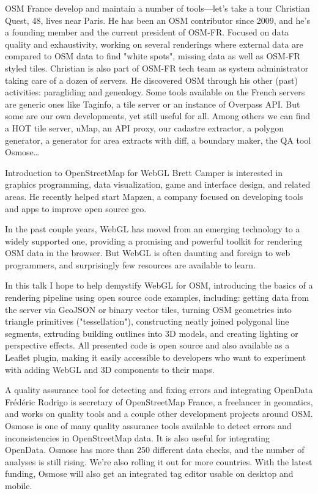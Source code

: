 %
{OSM France develop and maintain a number of tools---let's take a tour}%
{Christian Quest, 48, lives near Paris. He has been an OSM contributor
since 2009, and he's a founding member and the current president of
OSM-FR. Focused on data quality and exhaustivity, working on several
renderings where external data are compared to OSM data to find "white
spots", missing data as well as OSM-FR styled tiles. Christian is also
part of OSM-FR tech team as system administrator taking care of a dozen
of servers. He discovered OSM through his other (past) activities:
paragliding and genealogy.}%
{Some tools available on the French servers are generic ones like Taginfo, a tile server or an instance of Overpass API. But some are our own developments, yet still useful for all. Among others we can find a HOT tile server, uMap, an API proxy, our cadastre extractor, a polygon generator, a generator for area extracts with diff, a boundary maker, the QA tool Osmose\dots}



%
{Introduction to OpenStreetMap for WebGL}%
{Brett Camper is interested in graphics programming, data visualization, game and interface design, and related areas. He recently helped start Mapzen, a company focused on developing tools and apps to improve open source geo.}%
{In the past couple years, WebGL has moved from an emerging technology to a widely supported one, providing a promising and powerful toolkit for rendering OSM data in the browser. But WebGL is often daunting and foreign to web programmers, and surprisingly few resources are available to learn.

In this talk I hope to help demystify WebGL for OSM, introducing the basics of a rendering pipeline using open source code examples, including: getting data from the server via GeoJSON or binary vector tiles, turning OSM geometries into triangle primitives ("tessellation"), constructing neatly joined polygonal line segments, extruding building outlines into 3D models, and creating lighting or perspective effects. All presented code is open source and also available as a Leaflet plugin, making it easily accessible to developers who want to experiment with adding WebGL and 3D components to their maps.}


%
{A quality assurance tool for detecting and fixing errors and integrating OpenData}%
{Frédéric Rodrigo is secretary of OpenStreetMap France, a freelancer in geomatics, and works on quality tools and a couple other development projects around OSM.}%
{Osmose is one of many quality assurance tools available to detect errors and inconsistencies in OpenStreetMap data. It is also useful for integrating OpenData. Osmose has more than 250 different data checks, and the number of analyses is still rising. We're also rolling it out for more countries. With the latest funding, Osmose will also get an integrated tag editor usable on desktop and mobile.}

